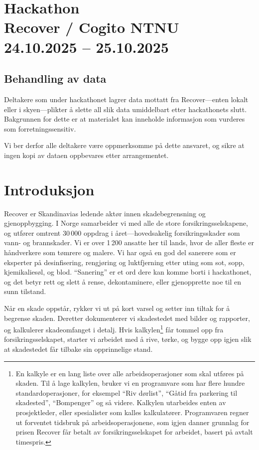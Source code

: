 \documentclass[a4paper]{article}
\begin{document}
\section*{Hackathon\\Recover / Cogito NTNU\\24.10.2025 -- 25.10.2025}

\subsection*{Behandling av data}
Deltakere som under hackathonet lagrer data mottatt fra Recover---enten lokalt eller i skyen---plikter å slette all slik data umiddelbart etter hackathonets slutt. Bakgrunnen for dette er at materialet kan inneholde informasjon som vurderes som forretningssensitiv.

Vi ber derfor alle deltakere være oppmerksomme på dette ansvaret, og sikre at ingen kopi av dataen oppbevares etter arrangementet.

\section{Introduksjon}
Recover er Skandinavias ledende aktør innen skadebegrensning og gjenoppbygging. I Norge samarbeider vi med alle de store forsikringsselskapene, og utfører omtrent 30\,000 oppdrag i året---hovedsakelig forsikringsskader som vann- og brannskader. Vi er over 1\,200 ansatte her til lands, hvor de aller fleste er håndverkere som tømrere og malere. Vi har også en god del sanerere som er eksperter på desinfisering, rengjøring og luktfjerning etter uting som sot, sopp, kjemikaliesøl, og blod. ``Sanering'' er et ord dere kan komme borti i hackathonet, og det betyr rett og slett å rense, dekontaminere, eller gjenopprette noe til en sunn tilstand.

Når en skade oppstår, rykker vi ut på kort varsel og setter inn tiltak for å begrense skaden. Deretter dokumenterer vi skadestedet med bilder og rapporter, og kalkulerer skadeomfanget i detalj. Hvis kalkylen\footnote{En kalkyle er en lang liste over alle arbeidsoperasjoner som skal utføres på skaden. Til å lage kalkylen, bruker vi en programvare som har flere hundre standardoperasjoner, for eksempel ``Riv dørlist'', ``Gåtid fra parkering til skadested'', ``Bompenger'' og så videre. Kalkylen utarbeides enten av prosjektleder, eller spesialister som kalles kalkulatører. Programvaren regner ut forventet tidsbruk på arbeidsoperasjonene, som igjen danner grunnlag for prisen Recover får betalt av forsikringsselskapet for arbeidet, basert på avtalt timespris.} får tommel opp fra forsikringsselskapet, starter vi arbeidet med å rive, tørke, og bygge opp igjen slik at skadestedet får tilbake sin opprinnelige stand.
\end{document}

